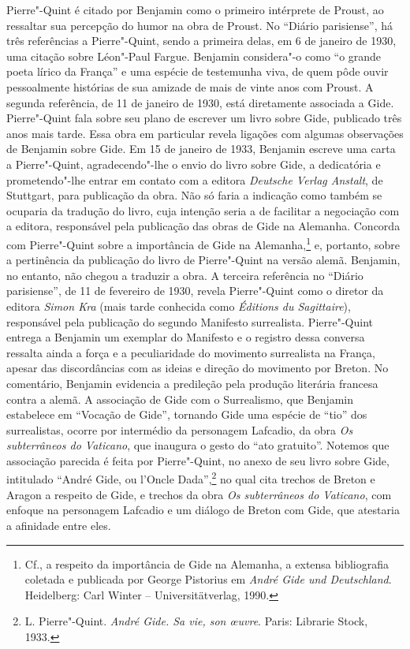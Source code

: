Pierre"-Quint é citado por Benjamin como o primeiro intérprete de Proust,
ao ressaltar sua percepção do humor na obra de Proust. No ``Diário
parisiense'', há três referências a Pierre"-Quint, sendo a primeira delas, em 6 de janeiro de 1930, uma citação sobre Léon"-Paul Fargue. Benjamin considera"-o como
``o grande poeta lírico da França'' e uma espécie de testemunha viva, de
quem pôde ouvir pessoalmente histórias de sua amizade de mais de vinte
anos com Proust. A segunda referência, de 11 de janeiro de 1930, está
diretamente associada a Gide. Pierre"-Quint fala sobre seu plano de
escrever um livro sobre Gide, publicado três anos mais tarde. Essa obra
em particular revela ligações com algumas observações de Benjamin sobre
Gide. Em 15 de janeiro de 1933, Benjamin escreve uma carta a Pierre"-Quint,
agradecendo"-lhe o envio do livro sobre Gide, a dedicatória e
prometendo"-lhe entrar em contato com a editora \emph{Deutsche Verlag
Anstalt}, de Stuttgart, para publicação da obra. Não só faria a
indicação como também se ocuparia da tradução do livro, cuja intenção
seria a de facilitar a negociação com a editora, responsável pela
publicação das obras de Gide na Alemanha. Concorda com Pierre"-Quint
sobre a importância de Gide na Alemanha,\footnote{Cf., a respeito da
  importância de Gide na Alemanha, a extensa bibliografia coletada e
  publicada por George Pistorius em \emph{André Gide und Deutschland}.
  Heidelberg: Carl Winter -- Universitätverlag, 1990.} e, portanto, sobre
a pertinência da publicação do livro de Pierre"-Quint na versão alemã.
Benjamin, no entanto, não chegou a traduzir a obra. A terceira
referência no ``Diário parisiense'', de 11 de fevereiro de 1930, revela Pierre"-Quint
como o diretor da editora \emph{Simon Kra} (mais tarde conhecida como
\emph{Éditions du Sagittaire}), responsável pela publicação do segundo
Manifesto surrealista. Pierre"-Quint entrega a Benjamin um exemplar do
Manifesto e o registro dessa conversa ressalta ainda a força e a
peculiaridade do movimento surrealista na França, apesar das
discordâncias com as ideias e direção do movimento por Breton. No
comentário, Benjamin evidencia a predileção pela produção literária
francesa contra a alemã. A associação de Gide com o Surrealismo, que
Benjamin estabelece em ``Vocação de Gide'', tornando Gide uma espécie de
``tio'' dos surrealistas, ocorre por intermédio da personagem
Lafcadio, da obra \emph{Os subterrâneos do Vaticano}, que
inaugura o gesto do ``ato gratuito''. Notemos que associação parecida é
feita por Pierre"-Quint, no anexo de seu livro sobre Gide, intitulado
``André Gide, ou l'Oncle Dada'',\footnote{L. Pierre"-Quint. \emph{André
  Gide. Sa vie, son \oe uvre}. Paris: Librarie Stock, 1933.} no qual
cita trechos de Breton e Aragon a respeito de Gide, e trechos da obra
\emph{Os subterrâneos do Vaticano}, com enfoque na personagem
Lafcadio e um diálogo de Breton com Gide, que atestaria a afinidade
entre eles.

